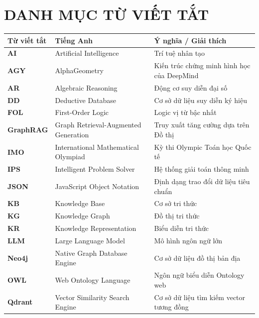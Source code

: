 
\chapter*{DANH MỤC TỪ VIẾT TẮT}

\begin{table}[h!]
\centering
\renewcommand{\arraystretch}{1.3}
\begin{tabular}{lll}
\toprule
\textbf{Từ viết tắt} & \textbf{Tiếng Anh} & \textbf{Ý nghĩa / Giải thích} \\
\midrule
\textbf{AI} & Artificial Intelligence & Trí tuệ nhân tạo \\
\textbf{AGY} & AlphaGeometry & Kiến trúc chứng minh hình học của DeepMind \\
\textbf{AR} & Algebraic Reasoning & Động cơ suy diễn đại số \\
\textbf{DD} & Deductive Database & Cơ sở dữ liệu suy diễn ký hiệu \\
\textbf{FOL} & First-Order Logic & Logic vị từ bậc nhất \\
\textbf{GraphRAG} & Graph Retrieval-Augmented Generation & Truy xuất tăng cường dựa trên Đồ thị \\
\textbf{IMO} & International Mathematical Olympiad & Kỳ thi Olympic Toán học Quốc tế \\
\textbf{IPS} & Intelligent Problem Solver & Hệ thống giải toán thông minh \\
\textbf{JSON} & JavaScript Object Notation & Định dạng trao đổi dữ liệu tiêu chuẩn \\
\textbf{KB} & Knowledge Base & Cơ sở tri thức \\
\textbf{KG} & Knowledge Graph & Đồ thị tri thức \\
\textbf{KR} & Knowledge Representation & Biểu diễn tri thức \\
\textbf{LLM} & Large Language Model & Mô hình ngôn ngữ lớn \\
\textbf{Neo4j} & Native Graph Database Engine & Cơ sở dữ liệu đồ thị bản địa \\
\textbf{OWL} & Web Ontology Language & Ngôn ngữ biểu diễn Ontology web \\
\textbf{Qdrant} & Vector Similarity Search Engine & Cơ sở dữ liệu tìm kiếm vector tương đồng \\

\end{tabular}
\end{table}
